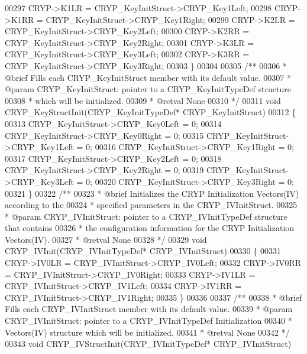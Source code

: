 \begin{DoxyCode}
00297   CRYP->K1LR = CRYP\_KeyInitStruct->CRYP\_Key1Left;
00298   CRYP->K1RR = CRYP\_KeyInitStruct->CRYP\_Key1Right;
00299   CRYP->K2LR = CRYP\_KeyInitStruct->CRYP\_Key2Left;
00300   CRYP->K2RR = CRYP\_KeyInitStruct->CRYP\_Key2Right;
00301   CRYP->K3LR = CRYP\_KeyInitStruct->CRYP\_Key3Left;
00302   CRYP->K3RR = CRYP\_KeyInitStruct->CRYP\_Key3Right;
00303 \}
00304 
00305 \textcolor{comment}{/**}
00306 \textcolor{comment}{  * @brief  Fills each CRYP\_KeyInitStruct member with its default value.}
00307 \textcolor{comment}{  * @param  CRYP\_KeyInitStruct: pointer to a CRYP\_KeyInitTypeDef structure }
00308 \textcolor{comment}{  *         which will be initialized.}
00309 \textcolor{comment}{  * @retval None}
00310 \textcolor{comment}{  */}
00311 \textcolor{keywordtype}{void} CRYP_KeyStructInit(CRYP\_KeyInitTypeDef* CRYP\_KeyInitStruct)
00312 \{
00313   CRYP\_KeyInitStruct->CRYP_Key0Left  = 0;
00314   CRYP\_KeyInitStruct->CRYP_Key0Right = 0;
00315   CRYP\_KeyInitStruct->CRYP_Key1Left  = 0;
00316   CRYP\_KeyInitStruct->CRYP_Key1Right = 0;
00317   CRYP\_KeyInitStruct->CRYP_Key2Left  = 0;
00318   CRYP\_KeyInitStruct->CRYP_Key2Right = 0;
00319   CRYP\_KeyInitStruct->CRYP_Key3Left  = 0;
00320   CRYP\_KeyInitStruct->CRYP_Key3Right = 0;
00321 \}
00322 \textcolor{comment}{/**}
00323 \textcolor{comment}{  * @brief  Initializes the CRYP Initialization Vectors(IV) according to the}
00324 \textcolor{comment}{  *         specified parameters in the CRYP\_IVInitStruct.}
00325 \textcolor{comment}{  * @param  CRYP\_IVInitStruct: pointer to a CRYP\_IVInitTypeDef structure that contains}
00326 \textcolor{comment}{  *         the configuration information for the CRYP Initialization Vectors(IV).}
00327 \textcolor{comment}{  * @retval None}
00328 \textcolor{comment}{  */}
00329 \textcolor{keywordtype}{void} CRYP_IVInit(CRYP\_IVInitTypeDef* CRYP\_IVInitStruct)
00330 \{
00331   CRYP->IV0LR = CRYP\_IVInitStruct->CRYP\_IV0Left;
00332   CRYP->IV0RR = CRYP\_IVInitStruct->CRYP\_IV0Right;
00333   CRYP->IV1LR = CRYP\_IVInitStruct->CRYP\_IV1Left;
00334   CRYP->IV1RR = CRYP\_IVInitStruct->CRYP\_IV1Right;
00335 \}
00336 
00337 \textcolor{comment}{/**}
00338 \textcolor{comment}{  * @brief  Fills each CRYP\_IVInitStruct member with its default value.}
00339 \textcolor{comment}{  * @param  CRYP\_IVInitStruct: pointer to a CRYP\_IVInitTypeDef Initialization }
00340 \textcolor{comment}{  *         Vectors(IV) structure which will be initialized.}
00341 \textcolor{comment}{  * @retval None}
00342 \textcolor{comment}{  */}
00343 \textcolor{keywordtype}{void} CRYP_IVStructInit(CRYP\_IVInitTypeDef* CRYP\_IVInitStruct)

\end{DoxyCode}
